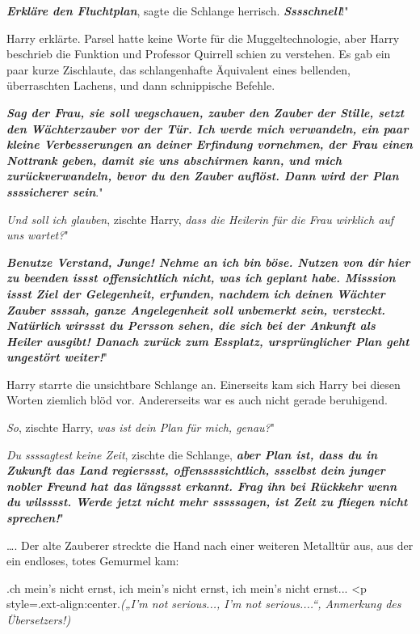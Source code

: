 \glqq{}\textbf{\emph{Erkläre den Fluchtplan}}\grqq{}, sagte die Schlange
herrisch. \glqq{}\textbf{\emph{Sssschnell}}!"

Harry erklärte. Parsel hatte keine Worte für die Muggeltechnologie, aber Harry
beschrieb die Funktion und Professor Quirrell schien zu verstehen. Es gab ein
paar kurze Zischlaute, das schlangenhafte Äquivalent eines bellenden,
überraschten Lachens, und dann schnippische Befehle.

\glqq{}\textbf{\emph{Sag der Frau, sie soll wegschauen, zauber den Zauber der
Stille, setzt den Wächterzauber vor der Tür. Ich werde mich verwandeln, ein paar
kleine Verbesserungen an deiner Erfindung vornehmen, der Frau einen Nottrank
geben, damit sie uns abschirmen kann, und mich zurückverwandeln, bevor du den
Zauber auflöst. Dann wird der Plan ssssicherer sein}}."

\glqq{}\emph{Und soll ich glauben}\grqq{}, zischte Harry, \glqq{}\emph{dass die
Heilerin für die Frau wirklich auf uns wartet?}"

\glqq{}\textbf{\emph{Benutze Verstand, Junge! Nehme an ich bin böse. Nutzen von
dir}} \textbf{\emph{hier zu beenden issst offensichtlich nicht, was ich geplant
habe. Misssion issst Ziel der Gelegenheit, erfunden, nachdem ich deinen Wächter
Zauber ssssah, ganze Angelegenheit soll unbemerkt sein, versteckt. Natürlich
wirssst du Persson sehen, die sich bei der Ankunft als Heiler ausgibt! Danach
zurück zum Essplatz, ursprünglicher Plan geht ungestört weiter!}}"

Harry starrte die unsichtbare Schlange an. Einerseits kam sich Harry bei diesen
Worten ziemlich blöd vor. Andererseits war es auch nicht gerade beruhigend.

\glqq{}\emph{So}\grqq{}, zischte Harry, \glqq{}\emph{was ist dein Plan für mich,
genau?}"

\glqq{}\emph{Du ssssagtest keine Zeit}\grqq{}, zischte die Schlange, \glqq{}
\textbf{\emph{aber Plan ist, dass du in Zukunft das Land regierssst,
offenssssichtlich, ssselbst dein junger nobler Freund hat das längssst erkannt.
Frag ihn bei Rückkehr wenn du wilsssst. Werde jetzt nicht mehr sssssagen, ist
Zeit zu fliegen nicht sprechen!}}"

…. Der alte Zauberer streckte die Hand nach einer weiteren Metalltür aus, aus
der ein endloses, totes Gemurmel kam:

\grqq{}.ch mein's nicht ernst, ich
mein's nicht ernst, ich mein's nicht ernst...\grqq{}   <p
style=\grqq{}.ext-align:center\grqq{}.\emph{(„I'm not serious..., I'm not
serious....“, Anmerkung des Übersetzers!)}

